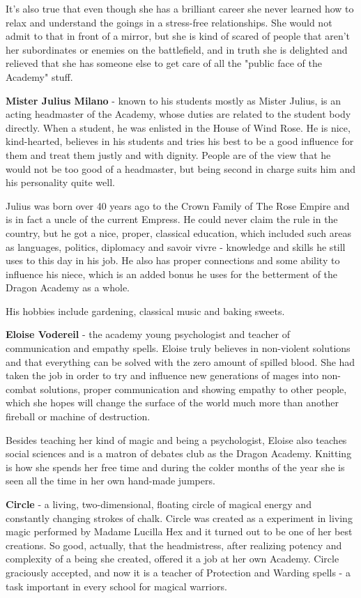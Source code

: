 \documentclass[a4paper,11pt]{article}
\begin{document}
It's also true that even though she has a brilliant career she never learned how to relax and understand the goings in a stress-free relationships. She would not admit to that in front of a mirror, but she is kind of scared of people that aren't her subordinates or enemies on the battlefield, and in truth she is delighted and relieved that she has someone else to get care of all the "public face of the Academy" stuff. 

\textbf{Mister Julius Milano} - known to his students mostly as Mister Julius, is an acting headmaster of the Academy, whose duties are related to the student body directly. When a student, he was enlisted in the House of Wind Rose. He is nice, kind-hearted, believes in his students and tries his best to be a good influence for them and treat them justly and with dignity. People are of the view that he would not be too good of a headmaster, but being second in charge suits him and his personality quite well. 

Julius was born over 40 years ago to the Crown Family of The Rose Empire and is in fact a uncle of the current Empress. He could never claim the rule in the country, but he got a nice, proper, classical education, which included such areas as languages, politics, diplomacy and savoir vivre - knowledge and skills he still uses to this day in his job. He also has proper connections and some ability to influence his niece, which is an added bonus he uses for the betterment of the Dragon Academy as a whole. 

His hobbies include gardening, classical music and baking sweets.  

\textbf{Eloise Vodereil} - the academy young psychologist and teacher of communication and empathy spells. Eloise truly believes in non-violent solutions and that everything can be solved with the zero amount of spilled blood. She had taken the job in order to try and influence new generations of mages into non-combat solutions, proper communication and showing empathy to other people, which she hopes will change the surface of the world much more than another fireball or machine of destruction. 

Besides teaching her kind of magic and being a psychologist, Eloise also teaches social sciences and is a matron of debates club as the Dragon Academy. Knitting is how she spends her free time and during the colder months of the year she is seen all the time in her own hand-made jumpers.  

\textbf{Circle} - a living, two-dimensional, floating circle of magical energy and constantly changing strokes of chalk. Circle was created as a experiment in living magic performed by Madame Lucilla Hex and it turned out to be one of her best creations. So good, actually, that the headmistress, after realizing potency and complexity of a being she created, offered it a job at her own Academy. Circle graciously accepted, and now it is a teacher of Protection and Warding spells - a task important in every school for magical warriors. 
\end{document}
